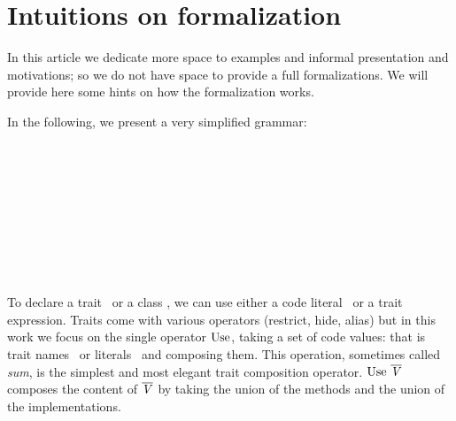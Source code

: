 \saveSpace\saveSpace\section{Intuitions on formalization}\label{sec:formal}
\saveSpace\saveSpace
In this article we dedicate more space to examples and informal presentation and motivations;
so we do not have space to provide a full formalizations.
We will provide here some hints on how the formalization works.

In the following, we present a very simplified grammar:

\begin{bnf}
\prodFull{}\\
\prodFull{}\\
\prodFull{}\\
\prodFull{}\\
\prodFull{}\\
\prodFull{}\\

\prodFull{}\\
\prodFull{}\\
\end{bnf}

To declare a trait \mTD\ or a class \mCD, we can use either a code literal \mL\ or a trait
expression.  Traits come with various operators (restrict, hide,
alias) but in this work we focus on the single operator 
$\use$, taking a set
of code values: that is trait names \mt\ or literals \mL\ and composing them.  This operation, sometimes called \emph{sum}, is the simplest and most elegant
trait composition operator.  $\use\ \overline\mV$ composes the content of $\overline{\mathit{V}}$
by taking the union of the methods and the union of the implementations.

